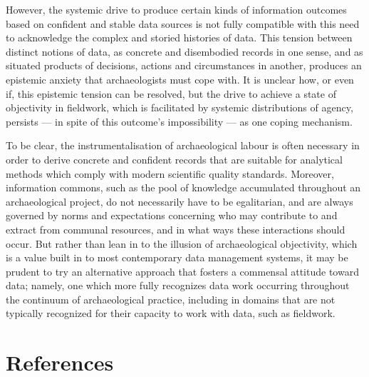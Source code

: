 \documentclass[
]{article}
\begin{document}
However, the systemic drive to produce certain kinds of information
outcomes based on confident and stable data sources is not fully
compatible with this need to acknowledge the complex and storied
histories of data. This tension between distinct notions of data, as
concrete and disembodied records in one sense, and as situated products
of decisions, actions and circumstances in another, produces an
epistemic anxiety that archaeologists must cope with. It is unclear how,
or even if, this epistemic tension can be resolved, but the drive to
achieve a state of objectivity in fieldwork, which is facilitated by
systemic distributions of agency, persists --- in spite of this
outcome's impossibility --- as one coping mechanism.

To be clear, the instrumentalisation of archaeological labour is often
necessary in order to derive concrete and confident records that are
suitable for analytical methods which comply with modern scientific
quality standards. Moreover, information commons, such as the pool of
knowledge accumulated throughout an archaeological project, do not
necessarily have to be egalitarian, and are always governed by norms and
expectations concerning who may contribute to and extract from communal
resources, and in what ways these interactions should occur. But rather
than lean in to the illusion of archaeological objectivity, which is a
value built in to most contemporary data management systems, it may be
prudent to try an alternative approach that fosters a commensal attitude
toward data; namely, one which more fully recognizes data work occurring
throughout the continuum of archaeological practice, including in
domains that are not typically recognized for their capacity to work
with data, such as fieldwork.

\newpage

\section{References}\label{references}
\end{document}
